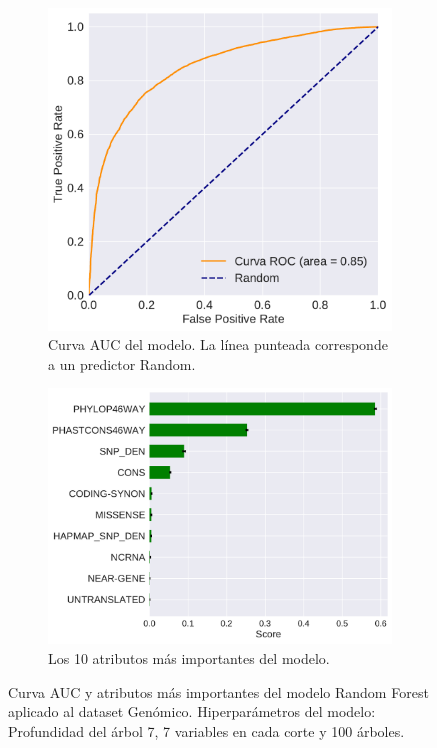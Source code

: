 \begin{figure}[H]
\centering
\begin{subfigure}[b]{0.7\textwidth}
    \centering
    \includegraphics[width=\textwidth]{documents/latex/figures/3/genomic/auc_genomic.pdf}
    \caption{Curva AUC del modelo. La línea punteada corresponde a un predictor Random.}
    \label{fig:auc_genomic}
\end{subfigure}

\hfill
\hfill

\begin{subfigure}[b]{0.7\textwidth}
    \centering
    \includegraphics[width=\textwidth]{documents/latex/figures/3/genomic/importances_genomic.pdf}
    \caption{Los 10 atributos más importantes del modelo.}
    \label{fig:importances_genomic}
\end{subfigure}

\caption{Curva AUC y atributos más importantes del modelo Random Forest aplicado al dataset Genómico. Hiperparámetros del modelo: Profundidad del árbol 7, 7 variables en cada corte y 100 árboles.}

\end{figure}
